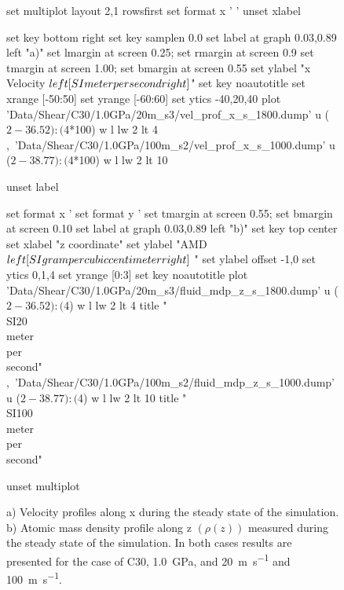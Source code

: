 \documentclass[aps,prb,reprint,superscriptaddress, a4paper]{revtex4-1}
\begin{document}
\begin{figure}
    	\begin{center}
		\begin{gnuplot}[terminal=pdf, terminaloptions={size \SERFigwidth cm, \SERFigheight cm color solid}]
			set multiplot layout 2,1 rowsfirst
			set format x ' '
			unset xlabel

			set key bottom right
			set key samplen  0.0
			set label at graph 0.03,0.89 left "a)"
			set lmargin at screen 0.25; set rmargin at screen 0.9
			set tmargin at screen 1.00; set bmargin at screen 0.55
			set ylabel "x Velocity $\\left[ \\SI{}{\\meter\\per\\second} \\right]$"
			set key noautotitle
			set xrange [-50:50]
			set yrange [-60:60]
			set ytics -40,20,40
			plot  	'Data/Shear/C30/1.0GPa/20m_s3/vel_prof_x_s_1800.dump' u ($2-36.52):($4*100) w l lw 2   lt 4   ,\
				  	'Data/Shear/C30/1.0GPa/100m_s2/vel_prof_x_s_1000.dump' u ($2-38.77):($4*100) w l  lw 2  lt 10   		
					
			unset label

			set format x '%
			set format y '%
			set tmargin at screen 0.55; set bmargin at screen 0.10
			set label at graph 0.03,0.89 left "b)"
			set key top center
			set xlabel "z coordinate"  
			set ylabel "AMD $\\left[ \\SI{}{\\gram\\per\\cubic\\centi\\meter} \\right]$ "
			set ylabel offset -1,0
			set ytics 0,1,4
			set yrange [0:3]
			set key noautotitle
			plot  	'Data/Shear/C30/1.0GPa/20m_s3/fluid_mdp_z_s_1800.dump' u ($2-36.52):($4) w l  lw 2  lt 4  title "\\SI{20}{\\meter\\per\\second}" ,\
				  	'Data/Shear/C30/1.0GPa/100m_s2/fluid_mdp_z_s_1000.dump' u ($2-38.77):($4) w l  lw 2  lt 10  title "\\SI{100}{\\meter\\per\\second}" 
			
			unset multiplot
		\end{gnuplot}
		\caption{a) Velocity profiles along x  during the steady state of the simulation.  b) Atomic mass density profile along z $\left(\rho \left(z\right) \right)$ measured during the  steady state of the simulation. In both cases results are presented for the case of  C30,  \SI{1.0}{\giga\pascal}, and  \SI{20}{\meter\per\second} and  \SI{100}{\meter\per\second}.}
		\label{fig:VelProf_MDP2}
	\end{center}
 \end{figure}
\end{document}
